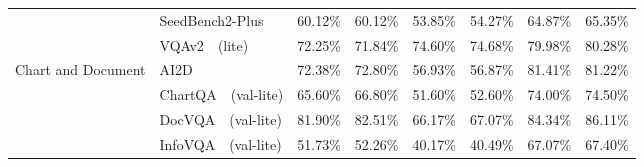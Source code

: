 \begin{table}[t!]
{\begin{tabular}{p{1.5cm}p{3cm}p{1.5cm}p{1.6cm}p{1.5cm}p{1.6cm}p{1.5cm}p{1.6cm}}
    & SeedBench2-Plus~\cite{li2024seed} \newline \tiny{\color{light-gray}{Multi-discip}} & 60.12\tiny{\%} & \cellcolor{front-color} 60.12\tiny{\%} \tiny{\color{brown}{+0.00\%}} & 53.85\tiny{\%} & \cellcolor{front-color} 54.27\tiny{\%} \tiny{\color{brown}{+0.42\%}} & 64.87\tiny{\%} & \cellcolor{front-color}65.35\tiny{\%} \tiny{\color{brown}{+0.48\%}} \\
    & VQAv2~\cite{antol2015vqa}~\tiny{(lite)} \newline \tiny{\color{light-gray}{Multi-discip}} & 72.25\tiny{\%} & \cellcolor{front-color} 71.84\tiny{\%} \tiny{\color{gray}{-0.41\%}} & 74.60\tiny{\%} & \cellcolor{front-color} 74.68\tiny{\%} \tiny{\color{brown}{+0.08\%}} & 79.98\tiny{\%} & \cellcolor{front-color}80.28\tiny{\%} \tiny{\color{brown}{+0.30\%}} \\
\cmidrule{2-8}
    \multirow{4}{*}{\parbox{1.5cm}{Chart and Document}} 
    & AI2D~\cite{kembhavi2016diagram} \newline \tiny{\color{light-gray}{Science Diagrams}} & 72.38\tiny{\%} & \cellcolor{front-color} 72.80\tiny{\%} \tiny{\color{brown}{+0.42\%}} & 56.93\tiny{\%} & \cellcolor{front-color} 56.87\tiny{\%} \tiny{\color{gray}{-0.06\%}} & 81.41\tiny{\%} & \cellcolor{front-color} 81.22\tiny{\%} \tiny{\color{gray}{-0.19\%}} \\
    & ChartQA~\cite{masry2022chartqa}~\tiny{(val-lite)} \newline \tiny{\color{light-gray}{Chart Understanding}} & 65.60\tiny{\%} & \cellcolor{front-color} 66.80\tiny{\%} \tiny{\color{brown}{+1.20\%}} & 51.60\tiny{\%} & \cellcolor{front-color} 52.60\tiny{\%} \tiny{\color{brown}{+1.00\%}} & 74.00\tiny{\%} & \cellcolor{front-color} 74.50\tiny{\%} \tiny{\color{brown}{+0.50\%}} \\
    & DocVQA~\cite{mathew2021docvqa}~\tiny{(val-lite)} \newline \tiny{\color{light-gray}{Document Understanding}} & 81.90\tiny{\%} & \cellcolor{front-color} 82.51\tiny{\%} \tiny{\color{brown}{+0.61\%}} & 66.17\tiny{\%} & \cellcolor{front-color} 67.07\tiny{\%} \tiny{\color{brown}{+0.90\%}} & 84.34\tiny{\%} & \cellcolor{front-color} 86.11\tiny{\%} \tiny{\color{brown}{+1.77\%}} \\
    & InfoVQA~\cite{mathew2022infographicvqa}~\tiny{(val-lite)} \newline \tiny{\color{light-gray}{Infographic Understanding}} & 51.73\tiny{\%} & \cellcolor{front-color} 52.26\tiny{\%} \tiny{\color{brown}{+0.53\%}} & 40.17\tiny{\%} & \cellcolor{front-color} 40.49\tiny{\%} \tiny{\color{brown}{+0.32\%}} & 67.07\tiny{\%} & \cellcolor{front-color} 67.40\tiny{\%} \tiny{\color{brown}{+0.33\%}} \\
\cmidrule{2-8}
     

\end{tabular}}
\end{table}
